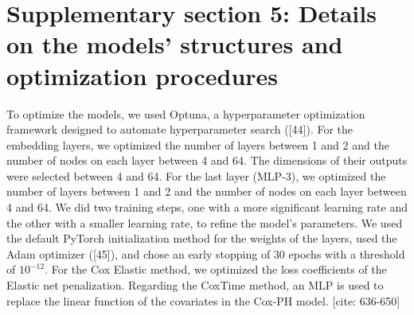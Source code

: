 \documentclass[a4paper,10pt]{article}
\begin{document}
\section*{Supplementary section 5: Details on the models' structures and optimization procedures}
To optimize the models, we used Optuna, a hyperparameter optimization framework designed to automate hyperparameter search ([44]). For the embedding layers, we optimized the number of layers between 1 and 2 and the number of nodes on each layer between 4 and 64. The dimensions of their outputs were selected between 4 and 64. For the last layer (MLP-3), we optimized the number of layers between 1 and 2 and the number of nodes on each layer between 4 and 64. We did two training steps, one with a more significant learning rate and the other with a smaller learning rate, to refine the model's parameters. We used the default PyTorch initialization method for the weights of the layers, used the Adam optimizer ([45]), and chose an early stopping of 30 epochs with a threshold of $10^{-12}$. For the Cox Elastic method, we optimized the loss coefficients of the Elastic net penalization. Regarding the CoxTime method, an MLP is used to replace the linear function of the covariates in the Cox-PH model. [cite: 636-650]
\end{document}
